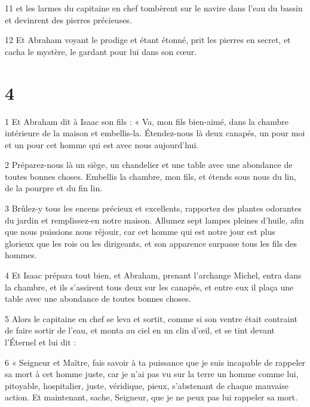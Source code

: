 \par 11 et les larmes du capitaine en chef tombèrent sur le navire dans l'eau du bassin et devinrent des pierres précieuses.

\par 12 Et Abraham voyant le prodige et étant étonné, prit les pierres en secret, et cacha le mystère, le gardant pour lui dans son cœur.

\chapter{4}

\par 1 Et Abraham dit à Isaac son fils : « Va, mon fils bien-aimé, dans la chambre intérieure de la maison et embellis-la. Étendez-nous là deux canapés, un pour moi et un pour cet homme qui est avec nous aujourd'hui.

\par 2 Préparez-nous là un siège, un chandelier et une table avec une abondance de toutes bonnes choses. Embellis la chambre, mon fils, et étends sous nous du lin, de la pourpre et du fin lin.

\par 3 Brûlez-y tous les encens précieux et excellents, rapportez des plantes odorantes du jardin et remplissez-en notre maison. Allumez sept lampes pleines d'huile, afin que nous puissions nous réjouir, car cet homme qui est notre jour est plus glorieux que les rois ou les dirigeants, et son apparence surpasse tous les fils des hommes.

\par 4 Et Isaac prépara tout bien, et Abraham, prenant l'archange Michel, entra dans la chambre, et ils s'assirent tous deux sur les canapés, et entre eux il plaça une table avec une abondance de toutes bonnes choses.

\par 5 Alors le capitaine en chef se leva et sortit, comme si son ventre était contraint de faire sortir de l'eau, et monta au ciel en un clin d'œil, et se tint devant l'Éternel et lui dit :

\par 6 « Seigneur et Maître, fais savoir à ta puissance que je suis incapable de rappeler sa mort à cet homme juste, car je n'ai pas vu sur la terre un homme comme lui, pitoyable, hospitalier, juste, véridique, pieux, s'abstenant de chaque mauvaise action. Et maintenant, sache, Seigneur, que je ne peux pas lui rappeler sa mort.

